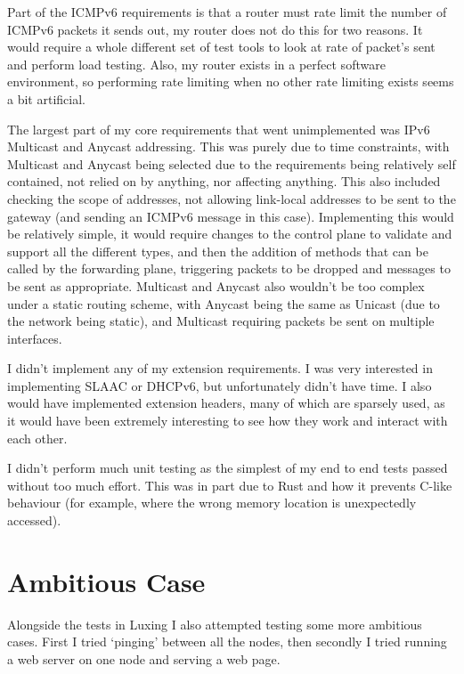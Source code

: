 \documentclass[12pt,a4paper,twoside,openright]{report}
\begin{document}
\bigskip

Part of the ICMPv6 requirements is that a router must rate limit the number of ICMPv6 packets it sends out, my router does not do this for two reasons.  It would require a whole different set of test tools to look at rate of packet's sent and perform load testing.  Also, my router exists in a perfect software environment, so performing rate limiting when no other rate limiting exists seems a bit artificial.

\bigskip

The largest part of my core requirements that went unimplemented was IPv6 Multicast and Anycast addressing.  This was purely due to time constraints, with Multicast and Anycast being selected due to the requirements being relatively self contained, not relied on by anything, nor affecting anything.  This also included checking the scope of addresses, not allowing link-local addresses to be sent to the gateway (and sending an ICMPv6 message in this case).  Implementing this would be relatively simple, it would require changes to the control plane to validate and support all the different types, and then the addition of methods that can be called by the forwarding plane, triggering packets to be dropped and messages to be sent as appropriate. Multicast and Anycast also wouldn't be too complex under a static routing scheme, with Anycast being the same as Unicast (due to the network being static), and Multicast requiring packets be sent on multiple interfaces.

\bigskip

I didn't implement any of my extension requirements.  I was very interested in implementing SLAAC or DHCPv6, but unfortunately didn't have time.  I also would have implemented extension headers, many of which are sparsely used, as it would have been extremely interesting to see how they work and interact with each other.

\bigskip

I didn't perform much unit testing as the simplest of my end to end tests passed without too much effort.  This was in part due to Rust and how it prevents C-like behaviour (for example, where the wrong memory location is unexpectedly accessed).

\section{Ambitious Case}

Alongside the tests in Luxing I also attempted testing some more ambitious cases.  First I tried `pinging' between all the nodes, then secondly I tried running a web server on one node and serving a web page.
\end{document}
